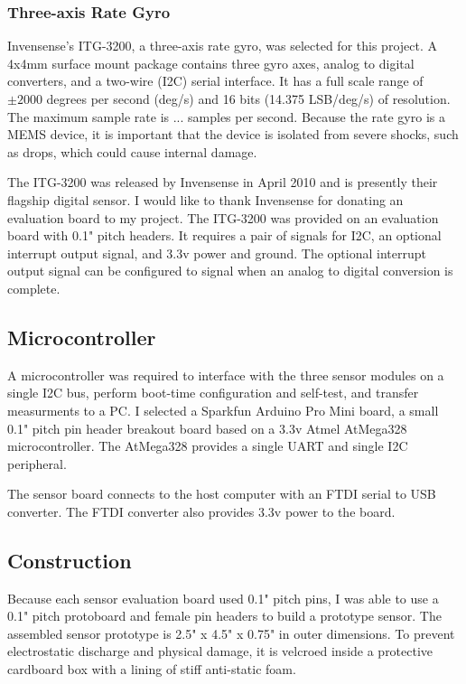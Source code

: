 \documentclass[12pt]{report}
\begin{document}
\subsubsection{Three-axis Rate Gyro}

Invensense's ITG-3200, a three-axis rate gyro, was selected for this project. A 4x4mm surface mount package contains three gyro axes, analog to digital converters, and a two-wire (I2C) serial interface. It has a full scale range of $\pm 2000$ degrees per second (deg/s) and 16 bits (14.375 LSB/deg/s) of resolution. The maximum sample rate is ... samples per second. Because the rate gyro is a MEMS device, it is important that the device is isolated from severe shocks, such as drops, which could cause internal damage.

The ITG-3200 was released by Invensense in April 2010 and is presently their flagship digital sensor. I would like to thank Invensense for donating an evaluation board to my project. The ITG-3200 was provided on an evaluation board with 0.1" pitch headers. It requires a pair of signals for I2C, an optional interrupt output signal, and 3.3v power and ground. The optional interrupt output signal can be configured to signal when an analog to digital conversion is complete.


\subsection{Microcontroller}
A microcontroller was required to interface with the three sensor modules on a single I2C bus, perform boot-time configuration and self-test, and transfer measurments to a PC. I selected a Sparkfun Arduino Pro Mini board, a small 0.1" pitch pin header breakout board based on a 3.3v Atmel AtMega328 microcontroller. The AtMega328 provides a single UART and single I2C peripheral. 

The sensor board connects to the host computer with an FTDI serial to USB converter. The FTDI converter also provides 3.3v power to the board.


\subsection{Construction}

Because each sensor evaluation board used 0.1" pitch pins, I was able to use a 0.1" pitch protoboard and female pin headers to build a prototype sensor. The assembled sensor prototype is 2.5" x 4.5" x 0.75" in outer dimensions. To prevent electrostatic discharge and physical damage, it is velcroed inside a protective cardboard box with a lining of stiff anti-static foam. 
\end{document}

